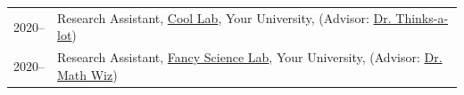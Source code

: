 
\begin{longtable}[l]{@{}p{} p{}@{}}

    2020-- & Research Assistant, \href{https://example.com/}{Cool Lab}, Your University, (Advisor: \href{https://example.com/}{Dr. Thinks-a-lot}) \\

    2020-- & Research Assistant, \href{https://example.com/}{Fancy Science Lab}, Your University, (Advisor: \href{https://example.com/}{Dr. Math Wiz}) \\

\end{longtable}